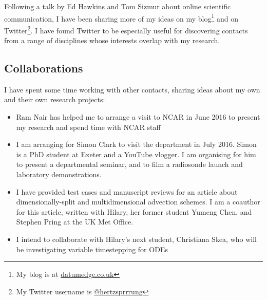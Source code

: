 \documentclass[a4paper,11pt]{article}
\begin{document}
Following a talk by Ed Hawkins and Tom Sizmur about online scientific communication, I have been sharing more of my ideas on my blog\footnote{My blog is at \url{datumedge.co.uk}} and on Twitter\footnote{My Twitter username is \href{https://twitter.com/hertzsprrrung}{@hertzsprrrung}}.  I have found Twitter to be especially useful for discovering contacts from a range of disciplines whose interests overlap with my research.

\subsection*{Collaborations}
I have spent some time working with other contacts, sharing ideas about my own and their own research projects:
\begin{itemize}
\item Ram Nair has helped me to arrange a visit to NCAR in June 2016 to present my research and spend time with NCAR staff
\item I am arranging for Simon Clark to visit the department in July 2016.  Simon is a PhD student at Exeter and a YouTube vlogger.  I am organising for him to present a departmental seminar, and to film a radiosonde launch and laboratory demonstrations.
\item I have provided test cases and manuscript reviews for an article about dimensionally-split and multidimensional advection schemes.  I am a coauthor for this article, written with Hilary, her former student Yumeng Chen, and Stephen Pring at the UK Met Office.
\item I intend to collaborate with Hilary's next student, Christiana Skea, who will be investigating variable timestepping for ODEs
\end{itemize}
\end{document}
